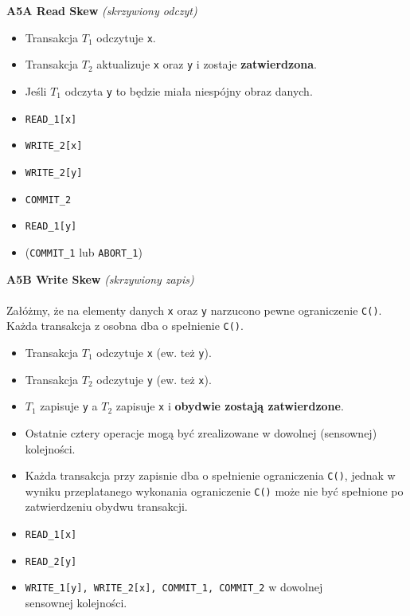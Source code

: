 \textbf{A5A Read Skew} \textit{(skrzywiony odczyt)}
\begin{itemize}
    \item Transakcja $T_1$ odczytuje \texttt{x}.
    \item Transakcja $T_2$ aktualizuje \texttt{x} oraz \texttt{y} i zostaje
    \textbf{zatwierdzona}.
    \item Jeśli $T_1$ odczyta \texttt{y} to będzie miała niespójny obraz
    danych.
    \item \texttt{READ\_1[x]}
    \item \texttt{WRITE\_2[x]}
    \item \texttt{WRITE\_2[y]}
    \item \texttt{COMMIT\_2}
    \item \texttt{READ\_1[y]}
    \item (\texttt{COMMIT\_1} lub \texttt{ABORT\_1})
\end{itemize}


\textbf{A5B Write Skew} \textit{(skrzywiony zapis)}\\\\
Załóżmy, że na elementy danych \texttt{x} oraz \texttt{y} narzucono pewne
ograniczenie \texttt{C()}. Każda transakcja z osobna dba o spełnienie
\texttt{C()}.
\begin{itemize}
    \item Transakcja $T_1$ odczytuje \texttt{x} (ew. też \texttt{y}).
    \item Transakcja $T_2$ odczytuje \texttt{y} (ew. też \texttt{x}).
    \item $T_1$ zapisuje \texttt{y} a $T_2$ zapisuje \texttt{x} i
    \textbf{obydwie zostają zatwierdzone}.
    \item Ostatnie cztery operacje mogą być zrealizowane w dowolnej
    (sensownej) kolejności.
    \item Każda transakcja przy zapisnie dba o spełnienie ograniczenia
    \texttt{C()}, jednak w wyniku przeplatanego wykonania ograniczenie
    \texttt{C()} może nie być spełnione po zatwierdzeniu obydwu
    transakcji.
    \item \texttt{READ\_1[x]}
    \item \texttt{READ\_2[y]}
    \item \texttt{WRITE\_1[y], WRITE\_2[x], COMMIT\_1, COMMIT\_2}
    w dowolnej\\ sensownej kolejności.
\end{itemize}


